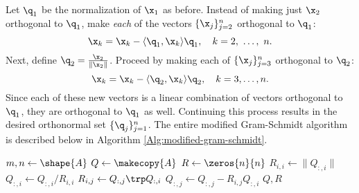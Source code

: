 Let $\q_1$ be the normalization of $\x_1$ as before.
Instead of making just $\x_2$ orthogonal to $\q_1$, make \emph{each} of the vectors $\{\x_j\}_{j=2}^n$ orthogonal to $\q_1$:
\[\x_k = \x_k - \langle \q_1,\x_{k} \rangle \q_1,\quad k=2,\ \ldots,\ n.\]
Next, define $\q_2 = \frac{\x_2}{\|\x_2\|}$.
Proceed by making each of $\{\x_j\}_{j=3}^n$ orthogonal to $\q_2$:
\[\x_k = \x_k - \langle \q_2,\x_{k} \rangle \q_2,\quad k=3,\ldots,n.\]
Since each of these new vectors is a linear combination of vectors orthogonal to $\q_1$, they are orthogonal to $\q_1$ as well.
Continuing this process results in the desired orthonormal set $\{\q_j\}_{j=1}^n$.
The entire modified Gram-Schmidt algorithm is described below in Algorithm \ref{Alg:modified-gram-schmidt}.

\begin{algorithm}[H]
\begin{algorithmic}[1]
    \State $m, n \gets \shape{A}$
    \State $Q \gets \makecopy{A}$
    \State $R \gets \zeros{n}{n}$
        \State $R_{i,i} \gets \|Q_{:,i}\|$\label{step:mgs-normalize}
        \State $Q_{:,i} \gets Q_{:,i}/R_{i,i}$\label{step:mgs-mult1}
            \State $R_{i,j} \gets Q_{:,j}\trp  Q_{:,i}$\label{step:mgs-mult2}
            \State $Q_{:,j} \gets Q_{:,j}-R_{i,j}Q_{:,i}$\label{step:mgs-mult3}
        \EndFor
    \EndFor
    \State {} $Q, R$
\EndProcedure
\end{algorithmic}
\caption{}
\label{Alg:modified-gram-schmidt}
\end{algorithm}

